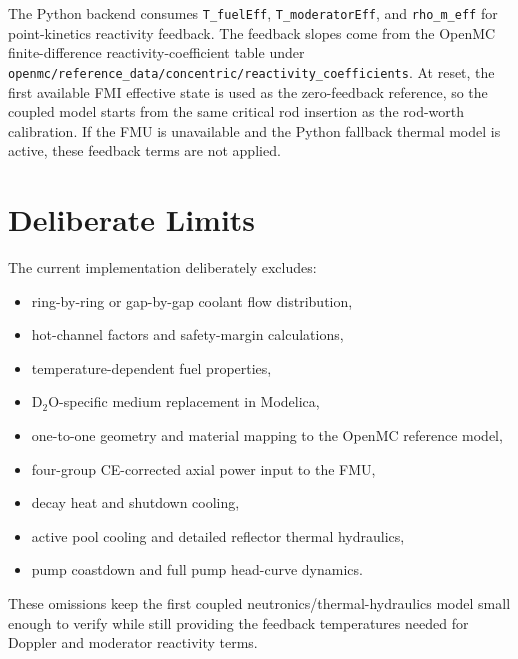 \documentclass[11pt]{article}
\begin{document}
The Python backend consumes \texttt{T\_fuelEff}, \texttt{T\_moderatorEff}, and
\texttt{rho\_m\_eff} for point-kinetics reactivity feedback.  The feedback
slopes come from the OpenMC finite-difference reactivity-coefficient table under
\texttt{openmc/reference\_data/concentric/reactivity\_coefficients}.  At reset,
the first available FMI effective state is used as the zero-feedback reference,
so the coupled model starts from the same critical rod insertion as the
rod-worth calibration.  If the FMU is unavailable and the Python fallback
thermal model is active, these feedback terms are not applied.

\section{Deliberate Limits}

The current implementation deliberately excludes:
\begin{itemize}
  \item ring-by-ring or gap-by-gap coolant flow distribution,
  \item hot-channel factors and safety-margin calculations,
  \item temperature-dependent fuel properties,
  \item D$_2$O-specific medium replacement in Modelica,
  \item one-to-one geometry and material mapping to the OpenMC reference model,
  \item four-group CE-corrected axial power input to the FMU,
  \item decay heat and shutdown cooling,
  \item active pool cooling and detailed reflector thermal hydraulics,
  \item pump coastdown and full pump head-curve dynamics.
\end{itemize}

These omissions keep the first coupled neutronics/thermal-hydraulics model
small enough to verify while still providing the feedback temperatures needed
for Doppler and moderator reactivity terms.
\end{document}
